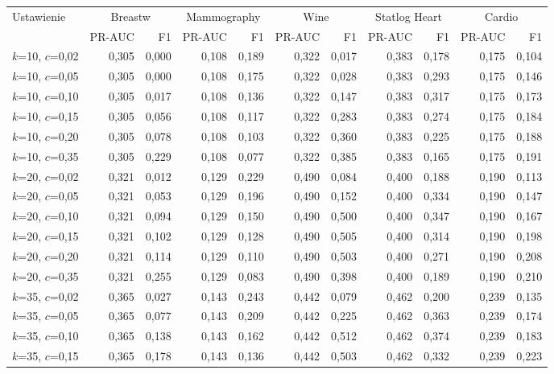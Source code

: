\begin{longtable}{lrrrrrrrrrr}
\toprule
Ustawienie & \multicolumn{2}{c}{Breastw} & \multicolumn{2}{c}{Mammography} & \multicolumn{2}{c}{Wine} & \multicolumn{2}{c}{Statlog Heart} & \multicolumn{2}{c}{Cardio} \\
 & PR-AUC & F1 & PR-AUC & F1 & PR-AUC & F1 & PR-AUC & F1 & PR-AUC & F1 \\
\midrule
\endhead
$k$=10, $c$=0,02 & 0,305 & 0,000 & 0,108 & 0,189 & 0,322 & 0,017 & 0,383 & 0,178 & 0,175 & 0,104 \\
$k$=10, $c$=0,05 & 0,305 & 0,000 & 0,108 & 0,175 & 0,322 & 0,028 & 0,383 & 0,293 & 0,175 & 0,146 \\
$k$=10, $c$=0,10 & 0,305 & 0,017 & 0,108 & 0,136 & 0,322 & 0,147 & 0,383 & 0,317 & 0,175 & 0,173 \\
$k$=10, $c$=0,15 & 0,305 & 0,056 & 0,108 & 0,117 & 0,322 & 0,283 & 0,383 & 0,274 & 0,175 & 0,184 \\
$k$=10, $c$=0,20 & 0,305 & 0,078 & 0,108 & 0,103 & 0,322 & 0,360 & 0,383 & 0,225 & 0,175 & 0,188 \\
$k$=10, $c$=0,35 & 0,305 & 0,229 & 0,108 & 0,077 & 0,322 & 0,385 & 0,383 & 0,165 & 0,175 & 0,191 \\
$k$=20, $c$=0,02 & 0,321 & 0,012 & 0,129 & 0,229 & 0,490 & 0,084 & 0,400 & 0,188 & 0,190 & 0,113 \\
$k$=20, $c$=0,05 & 0,321 & 0,053 & 0,129 & 0,196 & 0,490 & 0,152 & 0,400 & 0,334 & 0,190 & 0,147 \\
$k$=20, $c$=0,10 & 0,321 & 0,094 & 0,129 & 0,150 & 0,490 & 0,500 & 0,400 & 0,347 & 0,190 & 0,167 \\
$k$=20, $c$=0,15 & 0,321 & 0,102 & 0,129 & 0,128 & 0,490 & 0,505 & 0,400 & 0,314 & 0,190 & 0,198 \\
$k$=20, $c$=0,20 & 0,321 & 0,114 & 0,129 & 0,110 & 0,490 & 0,503 & 0,400 & 0,271 & 0,190 & 0,208 \\
$k$=20, $c$=0,35 & 0,321 & 0,255 & 0,129 & 0,083 & 0,490 & 0,398 & 0,400 & 0,189 & 0,190 & 0,210 \\
$k$=35, $c$=0,02 & 0,365 & 0,027 & 0,143 & 0,243 & 0,442 & 0,079 & 0,462 & 0,200 & 0,239 & 0,135 \\
$k$=35, $c$=0,05 & 0,365 & 0,077 & 0,143 & 0,209 & 0,442 & 0,225 & 0,462 & 0,363 & 0,239 & 0,174 \\
$k$=35, $c$=0,10 & 0,365 & 0,138 & 0,143 & 0,162 & 0,442 & 0,512 & 0,462 & 0,374 & 0,239 & 0,183 \\
$k$=35, $c$=0,15 & 0,365 & 0,178 & 0,143 & 0,136 & 0,442 & 0,503 & 0,462 & 0,332 & 0,239 & 0,223 \\

\end{longtable}
